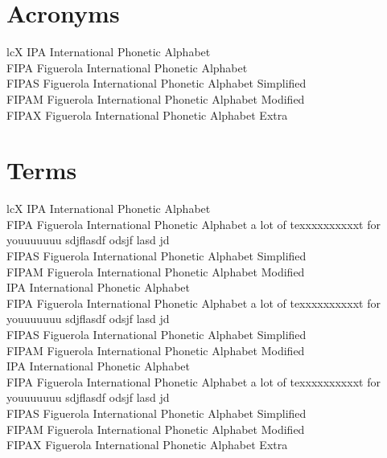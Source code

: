 \documentclass[12pt]{report}
\begin{document}
	\section*{Acronyms}
	\begin{xltabular}{\textwidth}{lcX}
		IPA \glsarrow International Phonetic Alphabet\\
		FIPA \glsarrow Figuerola International Phonetic Alphabet\\
		FIPAS \glsarrow Figuerola International Phonetic Alphabet Simplified\\
		FIPAM \glsarrow Figuerola International Phonetic Alphabet Modified\\
		FIPAX \glsarrow Figuerola International Phonetic Alphabet Extra
	\end{xltabular}
	
	\section*{Terms}
	\renewcommand{\arraystretch}{1.5}
	\begin{xltabular}{\textwidth}{lcX}
		IPA \glsarrow International Phonetic Alphabet\\
		FIPA \glsarrow Figuerola International Phonetic Alphabet a lot of texxxxxxxxxxt for youuuuuuu sdjflasdf odsjf lasd jd \\
		FIPAS \glsarrow Figuerola International Phonetic Alphabet Simplified\\
		FIPAM \glsarrow Figuerola International Phonetic Alphabet Modified\\
		IPA \glsarrow International Phonetic Alphabet\\
		FIPA \glsarrow Figuerola International Phonetic Alphabet a lot of texxxxxxxxxxt for youuuuuuu sdjflasdf odsjf lasd jd \\
		FIPAS \glsarrow Figuerola International Phonetic Alphabet Simplified\\
		FIPAM \glsarrow Figuerola International Phonetic Alphabet Modified\\
		IPA \glsarrow International Phonetic Alphabet\\
		FIPA \glsarrow Figuerola International Phonetic Alphabet a lot of texxxxxxxxxxt for youuuuuuu sdjflasdf odsjf lasd jd \\
		FIPAS \glsarrow Figuerola International Phonetic Alphabet Simplified\\
		FIPAM \glsarrow Figuerola International Phonetic Alphabet Modified\\
		FIPAX \glsarrow Figuerola International Phonetic Alphabet Extra
	\end{xltabular}
	\renewcommand{\arraystretch}{1}
	
	\renewcommand\bibname{References}
	
	
	
	
	
\end{document}
